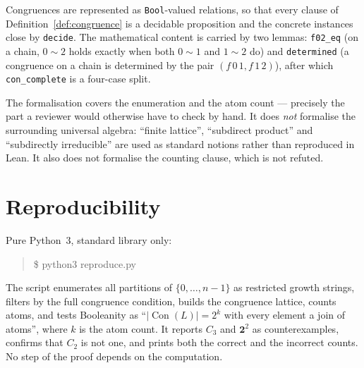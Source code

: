 \documentclass[11pt]{article}
\theoremstyle{definition}
\newcommand{\Con}{\operatorname{Con}}
\begin{document}
Congruences are represented as \texttt{Bool}-valued relations, so that every
clause of Definition~\ref{def:congruence} is a decidable proposition and the
concrete instances close by \texttt{decide}. The mathematical content is
carried by two lemmas: \texttt{f02\_eq} (on a chain, $0 \sim 2$ holds exactly
when both $0 \sim 1$ and $1 \sim 2$ do) and \texttt{determined} (a congruence on
a chain is determined by the pair $(f\,0\,1, f\,1\,2)$), after which
\texttt{con\_complete} is a four-case split.

The formalisation covers the enumeration and the atom count --- precisely the
part a reviewer would otherwise have to check by hand. It does \emph{not}
formalise the surrounding universal algebra: ``finite lattice'', ``subdirect
product'' and ``subdirectly irreducible'' are used as standard notions rather
than reproduced in Lean. It also does not formalise the counting clause, which
is not refuted.

\section{Reproducibility}

Pure Python~3, standard library only:

\begin{quote}\ttfamily
\$ python3 reproduce.py
\end{quote}

The script enumerates all partitions of $\{0,\dots,n-1\}$ as restricted growth
strings, filters by the full congruence condition, builds the congruence
lattice, counts atoms, and tests Booleanity as ``$|\Con(L)| = 2^{k}$ with every
element a join of atoms'', where $k$ is the atom count. It reports $C_3$ and
$\mathbf{2}^2$ as counterexamples, confirms that $C_2$ is not one, and prints
both the correct and the incorrect counts. No step of the proof depends on the
computation.
\end{document}
